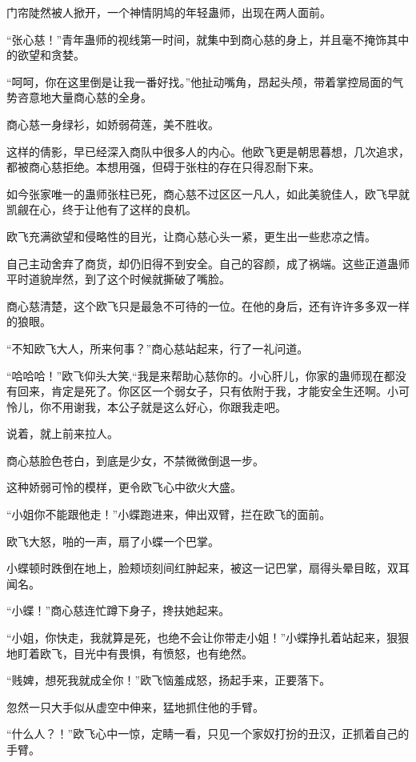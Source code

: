 \begin{this_body}
门帘陡然被人掀开，一个神情阴鸠的年轻蛊师，出现在两人面前。

“张心慈！”青年蛊师的视线第一时间，就集中到商心慈的身上，并且毫不掩饰其中的欲望和贪婪。

“呵呵，你在这里倒是让我一番好找。”他扯动嘴角，昂起头颅，带着掌控局面的气势咨意地大量商心慈的全身。

商心慈一身绿衫，如娇弱荷莲，美不胜收。

这样的倩影，早已经深入商队中很多人的内心。他欧飞更是朝思暮想，几次追求，都被商心慈拒绝。本想用强，但碍于张柱的存在只得忍耐下来。

如今张家唯一的蛊师张柱已死，商心慈不过区区一凡人，如此美貌佳人，欧飞早就凯觎在心，终于让他有了这样的良机。

欧飞充满欲望和侵略性的目光，让商心慈心头一紧，更生出一些悲凉之情。

自己主动舍弃了商货，却仍旧得不到安全。自己的容颜，成了祸端。这些正道蛊师平时道貌岸然，到了这个时候就撕破了嘴脸。

商心慈清楚，这个欧飞只是最急不可待的一位。在他的身后，还有许许多多双一样的狼眼。

“不知欧飞大人，所来何事？”商心慈站起来，行了一礼问道。

“哈哈哈！”欧飞仰头大笑,“我是来帮助心慈你的。小心肝儿，你家的蛊师现在都没有回来，肯定是死了。你区区一个弱女子，只有依附于我，才能安全生还啊。小可怜儿，你不用谢我，本公子就是这么好心，你跟我走吧。

说着，就上前来拉人。

商心慈脸色苍白，到底是少女，不禁微微倒退一步。

这种娇弱可怜的模样，更令欧飞心中欲火大盛。

“小姐你不能跟他走！”小蝶跑进来，伸出双臂，拦在欧飞的面前。

欧飞大怒，啪的一声，扇了小蝶一个巴掌。

小蝶顿时跌倒在地上，脸颊顷刻间红肿起来，被这一记巴掌，扇得头晕目眩，双耳闻名。

“小蝶！”商心慈连忙蹲下身子，搀扶她起来。

“小姐，你快走，我就算是死，也绝不会让你带走小姐！”小蝶挣扎着站起来，狠狠地盯着欧飞，目光中有畏惧，有愤怒，也有绝然。

“贱婢，想死我就成全你！”欧飞恼羞成怒，扬起手来，正要落下。

忽然一只大手似从虚空中伸来，猛地抓住他的手臂。

“什么人？！”欧飞心中一惊，定睛一看，只见一个家奴打扮的丑汉，正抓着自己的手臂。


\end{this_body}
